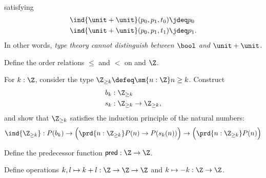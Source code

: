 \begin{exercises}
\begin{align*}
\end{align*}
satisfying
\begin{align*}
\ind{\unit+\unit}(p_0,p_1,t_0) & \jdeq p_0 \\
\ind{\unit+\unit}(p_0,p_1,t_1) & \jdeq p_1.
\end{align*}
In other words, \emph{type theory cannot distinguish between $\bool$ and $\unit+\unit$.}
\item \label{ex:int_order}
\begin{subexenum}
\item Define the order relations $\leq$ and $<$ on and $\Z$.
\item For $k:\Z$, consider the type $\Z_{\geq k}\defeq \sm{n:\Z}n\geq k$. Construct
\begin{align*}
b_k & : \Z_{\geq k} \\
s_k & : \Z_{\geq k}\to\Z_{\geq k},
\end{align*}
and show that $\Z_{\geq k}$ satisfies the induction principle of the natural numbers:
\begin{equation*}
\ind{\Z_{\geq k}} : P(b_k)\to \Big(\prd{n:\Z_{\geq k}} P(n)\to P(s_k(n))\Big)\to \Big(\prd{n:\Z_{\geq k}} P(n)\Big)
\end{equation*}
\end{subexenum}
\item \label{ex:int_pred}Define the predecessor function $\mathsf{pred}:\Z\to \Z$.
\item \label{ex:int_group_ops}Define operations $k,l\mapsto k+l:\Z\to\Z\to\Z$ and $k\mapsto -k:\Z\to \Z$.
\end{exercises}
